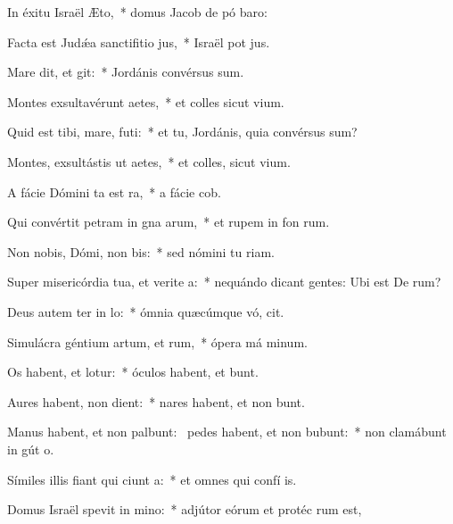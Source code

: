 \item In éxitu Israël  Æto,~* domus Jacob de pó baro:
\item Facta est Judǽa sanctifitio jus,~* Israël pot jus.
\item Mare dit, et git:~* Jordánis convérsus  sum.
\item Montes exsultavérunt  aetes,~* et colles sicut  vium.
\item Quid est tibi, mare,  futi:~* et tu, Jordánis, quia convérsus  sum?
\item Montes, exsultástis ut aetes,~* et colles, sicut  vium.
\item A fácie Dómini ta est ra,~* a fácie  cob.
\item Qui convértit petram in gna arum,~* et rupem in fon rum.
\item Non nobis, Dómi, non bis:~* sed nómini tu  riam.
\item Super misericórdia tua, et verite a:~* nequándo dicant gentes: Ubi est De rum?
\item Deus autem ter in lo:~* ómnia quæcúmque vó, cit.
\item Simulácra géntium artum, et rum,~* ópera má minum.
\item Os habent, et  lotur:~* óculos habent, et  bunt.
\item Aures habent,  non dient:~* nares habent, et non bunt.
\item Manus habent, et non palbunt:~\pscross{} pedes habent, et non bubunt:~* non clamábunt in gút o.
\item Símiles illis fiant qui ciunt a:~* et omnes qui confí  is.
\item Domus Israël spevit in mino:~* adjútor eórum et protéc rum est,
